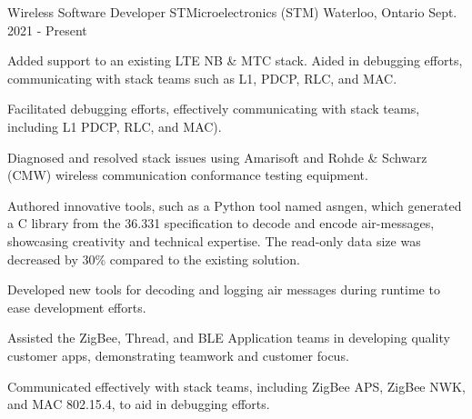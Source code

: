 
\begin{cventries}

  \cventry
    {Wireless Software Developer} %
    {STMicroelectronics (STM)} %
    {Waterloo, Ontario} %
    {Sept. 2021 - Present} %
    {
      \begin{cvitems} %
        \item {Added support to an existing LTE NB \& MTC stack. Aided in debugging efforts, communicating with stack teams such as L1, PDCP, RLC, and MAC.}
        \item {Facilitated debugging efforts, effectively communicating with stack teams, including L1 PDCP, RLC, and MAC).}
        \item {Diagnosed and resolved stack issues using Amarisoft and Rohde \& Schwarz (CMW) wireless communication conformance testing equipment.}
        \item {Authored innovative tools, such as a Python tool named asngen, which generated a C library from the 36.331 specification to decode and encode air-messages, showcasing creativity and technical expertise. The read-only data size was decreased by 30\% compared to the existing solution.}
        \item {Developed new tools for decoding and logging air messages during runtime to ease development efforts.}
        \item {Assisted the ZigBee, Thread, and BLE Application teams in developing quality customer apps, demonstrating teamwork and customer focus.}
        \item {Communicated effectively with stack teams, including ZigBee APS, ZigBee NWK, and MAC 802.15.4, to aid in debugging efforts.}
      \end{cvitems}
    }


\end{cventries}

